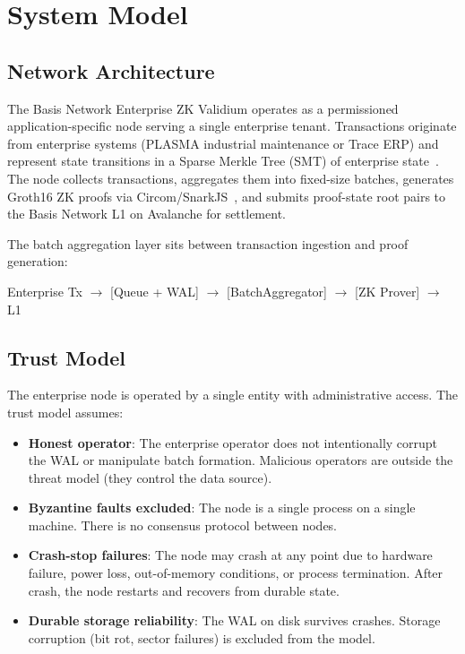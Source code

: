 
\section{System Model}

\subsection{Network Architecture}

The Basis Network Enterprise ZK Validium operates as a permissioned
application-specific node serving a single enterprise tenant. Transactions
originate from enterprise systems (PLASMA industrial maintenance or Trace ERP)
and represent state transitions in a Sparse Merkle Tree (SMT) of enterprise
state~\cite{baylina2019smt}. The node collects transactions, aggregates them
into fixed-size batches, generates Groth16 ZK proofs via
Circom/SnarkJS~\cite{groth2016size, snarkjs}, and submits proof-state root
pairs to the Basis Network L1 on Avalanche for settlement.

The batch aggregation layer sits between transaction ingestion and proof
generation:
\begin{center}
\small
Enterprise Tx $\rightarrow$ [Queue + WAL] $\rightarrow$ [BatchAggregator] $\rightarrow$ [ZK Prover] $\rightarrow$ L1
\end{center}

\subsection{Trust Model}

The enterprise node is operated by a single entity with administrative
access. The trust model assumes:

\begin{itemize}
\item \textbf{Honest operator}: The enterprise operator does not intentionally
  corrupt the WAL or manipulate batch formation. Malicious operators are outside
  the threat model (they control the data source).
\item \textbf{Byzantine faults excluded}: The node is a single process on a
  single machine. There is no consensus protocol between nodes.
\item \textbf{Crash-stop failures}: The node may crash at any point due to
  hardware failure, power loss, out-of-memory conditions, or process termination.
  After crash, the node restarts and recovers from durable state.
\item \textbf{Durable storage reliability}: The WAL on disk survives crashes.
  Storage corruption (bit rot, sector failures) is excluded from the model.
\end{itemize}

